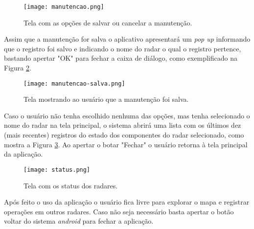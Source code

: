     \begin{figure}[H]
        \centering
        \texttt{[image: manutencao.png]}
        \caption{Tela com as opções de salvar ou cancelar a manutenção.}
        \label{fig:app-manutencao}
    \end{figure}

Assim que a manutenção for salva o aplicativo apresentará um \textit{pop up} informando que o registro foi salvo e indicando o nome do radar o qual o registro pertence, bastando apertar "OK" para fechar a caixa de diálogo, como exemplificado na Figura \ref{fig:app-salvo}.
    
    \begin{figure}[H]
        \centering
        \texttt{[image: manutencao-salva.png]}
\caption{Tela mostrando ao usuário que a manutenção foi salva.}
        \label{fig:app-salvo}
    \end{figure}

Caso o usuário não tenha escolhido nenhuma das opções, mas tenha selecionado o nome do radar na tela principal, o sistema abrirá uma lista com os últimos dez (mais recentes) registros do estado dos componentes do radar selecionado, como mostra a Figura \ref{fig:app-status}. Ao apertar o botar "Fechar" o usuário retorna à tela principal da aplicação.

    \begin{figure}[H]
        \centering
        \texttt{[image: status.png]}
        \caption{Tela com os status dos radares.}
        \label{fig:app-status}
    \end{figure}
    
Após feito o uso da aplicação o usuário fica livre para explorar o mapa e registrar operações em outros radares. Caso não seja necessário basta apertar o botão voltar do sistema \textit{android} para fechar a aplicação.


